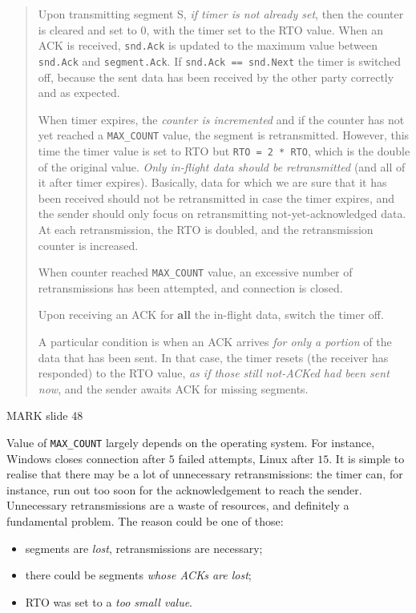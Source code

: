 \documentclass[10pt]{book}
\begin{document}
\begin{quote}

    Upon transmitting segment S, \emph{if timer is not already set}, then the
    counter is cleared and set to $0$, with the timer set to the RTO value.
    When an ACK is received, \texttt{snd.Ack} is updated to the maximum value
    between \texttt{snd.Ack} and \texttt{segment.Ack}. If \texttt{snd.Ack ==
    snd.Next} the timer is switched off, because the sent data has been
    received by the other party correctly and as expected.

    When timer expires, the \emph{counter is incremented} and if the counter
    has not yet reached a \texttt{MAX\_COUNT} value, the segment is
    retransmitted. However, this time the timer value is set to RTO but
    \texttt{RTO = 2 * RTO}, which is the double of the original value.
    \emph{Only in-flight data should be retransmitted} (and all of it after
    timer expires). Basically, data for which we are sure that it has been
    received should not be retransmitted in case the timer expires, and the
    sender should only focus on retransmitting not-yet-acknowledged data. At
    each retransmission, the RTO is doubled, and the retransmission counter is
    increased.

    When counter reached \texttt{MAX\_COUNT} value, an excessive number of
    retransmissions has been attempted, and connection is closed.

    Upon receiving an ACK for \textbf{all} the in-flight data, switch the timer
    off.

    A particular condition is when an ACK arrives \emph{for only a portion} of
    the data that has been sent. In that case, the timer resets (the receiver
    has responded) to the RTO value, \emph{as if those still not-ACKed had been
    sent now}, and the sender awaits ACK for missing segments. 
\end{quote}

MARK slide 48

Value of \texttt{MAX\_COUNT} largely depends on the operating system. For
instance, Windows closes connection after $5$ failed attempts, Linux after
$15$. It is simple to realise that there may be a lot of unnecessary
retransmissions: the timer can, for instance, run out too soon for the
acknowledgement to reach the sender. Unnecessary retransmissions are a waste of
resources, and definitely a fundamental problem. The reason could be one of those:

\begin{itemize}
    \item segments are \emph{lost}, retransmissions are necessary;
    \item there could be segments \emph{whose ACKs are lost};
    \item RTO was set to a \emph{too small value}.
\end{itemize}
\end{document}
